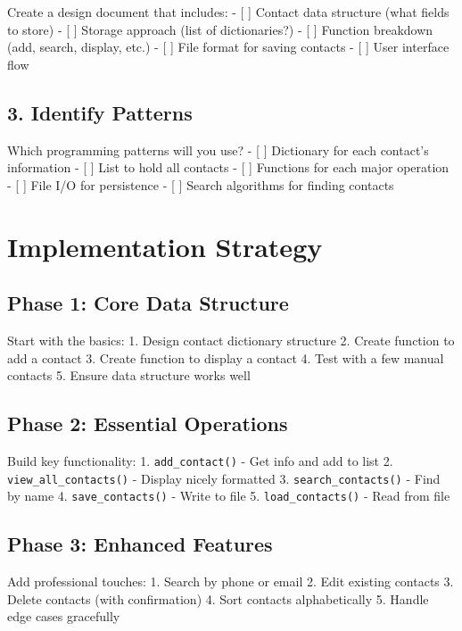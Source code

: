 \documentclass[
  letterpaper,
  DIV=11,
  numbers=noendperiod,
  oneside]{scrreprt}
\begin{document}
Create a design document that includes: - {[} {]} Contact data structure
(what fields to store) - {[} {]} Storage approach (list of
dictionaries?) - {[} {]} Function breakdown (add, search, display, etc.)
- {[} {]} File format for saving contacts - {[} {]} User interface flow

\subsection{3. Identify Patterns}\label{identify-patterns-5}

Which programming patterns will you use? - {[} {]} Dictionary for each
contact's information - {[} {]} List to hold all contacts - {[} {]}
Functions for each major operation - {[} {]} File I/O for persistence -
{[} {]} Search algorithms for finding contacts

\section{Implementation Strategy}\label{implementation-strategy-5}

\subsection{Phase 1: Core Data
Structure}\label{phase-1-core-data-structure}

Start with the basics: 1. Design contact dictionary structure 2. Create
function to add a contact 3. Create function to display a contact 4.
Test with a few manual contacts 5. Ensure data structure works well

\subsection{Phase 2: Essential
Operations}\label{phase-2-essential-operations}

Build key functionality: 1. \texttt{add\_contact()} - Get info and add
to list 2. \texttt{view\_all\_contacts()} - Display nicely formatted 3.
\texttt{search\_contacts()} - Find by name 4. \texttt{save\_contacts()}
- Write to file 5. \texttt{load\_contacts()} - Read from file

\subsection{Phase 3: Enhanced Features}\label{phase-3-enhanced-features}

Add professional touches: 1. Search by phone or email 2. Edit existing
contacts 3. Delete contacts (with confirmation) 4. Sort contacts
alphabetically 5. Handle edge cases gracefully
\end{document}
